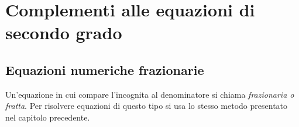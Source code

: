 % 
% 
% 

\section{Complementi alle equazioni di secondo grado}

\subsection{Equazioni numeriche frazionarie}
\label{sec:eq2gr_frazionarie}

Un'equazione in cui compare l'incognita al denominatore si chiama 
\emph{frazionaria o fratta}.
Per risolvere equazioni di questo tipo si usa lo stesso metodo presentato 
nel capitolo precedente.

